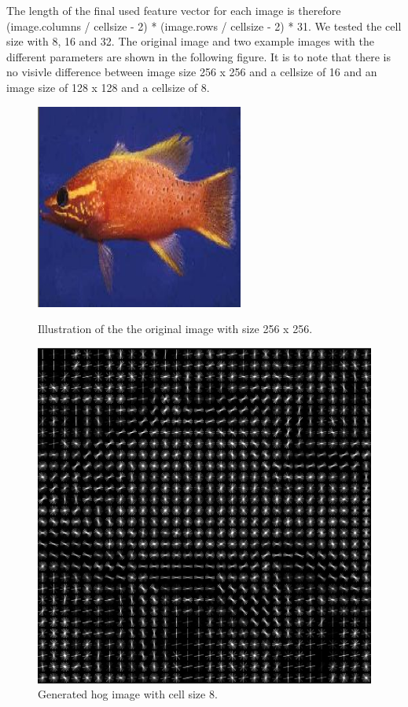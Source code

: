 \documentclass[a4paper,10pt]{article}
\begin{document}
The length of the final used feature vector for each image is therefore (image.columns / cellsize - 2)  * (image.rows / cellsize - 2) * 31.
We tested the cell size with 8, 16 and 32.
The original image and two example images with the different parameters are shown in the following figure.
It is to note that there is no visivle difference between image size 256 x 256 and a cellsize of 16 and an image size of 128 x 128 and a cellsize of 8.
\begin{figure}[htb]
\centering
\includegraphics[scale=0.5]{images/hog/256_256_original_fish.png}
\caption{Illustration of the the original image with size 256 x 256.}

\includegraphics[scale=0.5]{images/hog/256_256_8.png}

\caption{Generated hog image with cell size 8.}


\end{figure}
\end{document}
